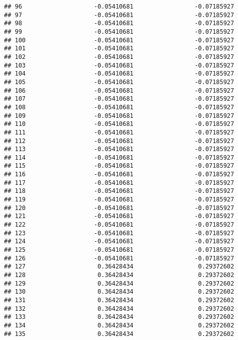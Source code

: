 \documentclass[]{article}
\begin{document}
\begin{verbatim}
## 96                    -0.05410681                 -0.07185927
## 97                    -0.05410681                 -0.07185927
## 98                    -0.05410681                 -0.07185927
## 99                    -0.05410681                 -0.07185927
## 100                   -0.05410681                 -0.07185927
## 101                   -0.05410681                 -0.07185927
## 102                   -0.05410681                 -0.07185927
## 103                   -0.05410681                 -0.07185927
## 104                   -0.05410681                 -0.07185927
## 105                   -0.05410681                 -0.07185927
## 106                   -0.05410681                 -0.07185927
## 107                   -0.05410681                 -0.07185927
## 108                   -0.05410681                 -0.07185927
## 109                   -0.05410681                 -0.07185927
## 110                   -0.05410681                 -0.07185927
## 111                   -0.05410681                 -0.07185927
## 112                   -0.05410681                 -0.07185927
## 113                   -0.05410681                 -0.07185927
## 114                   -0.05410681                 -0.07185927
## 115                   -0.05410681                 -0.07185927
## 116                   -0.05410681                 -0.07185927
## 117                   -0.05410681                 -0.07185927
## 118                   -0.05410681                 -0.07185927
## 119                   -0.05410681                 -0.07185927
## 120                   -0.05410681                 -0.07185927
## 121                   -0.05410681                 -0.07185927
## 122                   -0.05410681                 -0.07185927
## 123                   -0.05410681                 -0.07185927
## 124                   -0.05410681                 -0.07185927
## 125                   -0.05410681                 -0.07185927
## 126                   -0.05410681                 -0.07185927
## 127                    0.36428434                  0.29372602
## 128                    0.36428434                  0.29372602
## 129                    0.36428434                  0.29372602
## 130                    0.36428434                  0.29372602
## 131                    0.36428434                  0.29372602
## 132                    0.36428434                  0.29372602
## 133                    0.36428434                  0.29372602
## 134                    0.36428434                  0.29372602
## 135                    0.36428434                  0.29372602

\end{verbatim}
\end{document}
